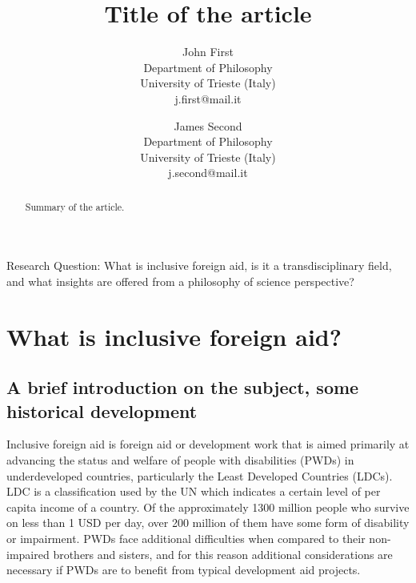 \documentclass{lps}
\begin{document}
\title{Title of the article}
\author{John First\\Department of Philosophy\\University of Trieste (Italy)\\j.first@mail.it \and%
            James Second\\Department of Philosophy\\University of Trieste (Italy)\\j.second@mail.it}

\maketitle
\newpage

Research Question: What is inclusive foreign aid, is it a transdisciplinary field, and what
insights are offered from a philosophy of science perspective?

\tableofcontents



\begin{abstract}
Summary of the article.
\end{abstract}
\newpage




\section{What is inclusive foreign aid?}

\subsection{A brief introduction on the subject, some historical development}

Inclusive foreign aid is foreign aid or development work that is aimed
primarily at advancing the status and welfare of people with disabilities
(PWDs) in underdeveloped countries, particularly the Least Developed Countries
(LDCs). LDC is a classification used by the UN which indicates a certain level
of per capita income of a country. Of the approximately 1300 million people
who survive on less than 1 USD per day, over 200 million of them have some
form of disability or impairment. PWDs face additional difficulties when
compared to their non-impaired brothers and sisters, and for this reason
additional considerations are necessary if PWDs are to benefit from typical
development aid projects. 
\end{document}
